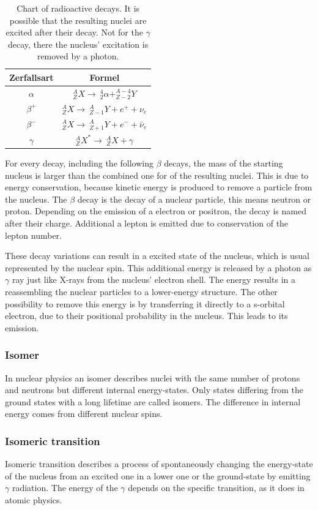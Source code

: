 \documentclass[]{article}
\begin{document}
\renewcommand{\arraystretch}{1.5}
\begin{table}[H]
\centering
\begin{tabular}{c||c}
Zerfallsart & Formel   \\ \hline
$\alpha$ & $_Z^A X \rightarrow\ _2^4\alpha + _{Z-2}^{A-4} Y$ \\ \hline
$\beta^+$ &   $_Z^A X \rightarrow\  _{Z-1}^{A}Y + e^+ + \nu_e$ \\ \hline
$\beta^-$ &   $_Z^A X \rightarrow\  _{Z+1}^{A}Y + e^- +  \bar{\nu}_e$ \\ \hline
$\gamma$ &  $_Z^A X^* \rightarrow\ _Z^A X + \gamma$  \end{tabular}
\caption{Chart of radioactive decays. It is possible that the resulting nuclei are excited after their decay. Not for the $\gamma$ decay, there the nucleus' excitation is removed by a photon. }
\label{tab:zerfall}
\end{table}
\renewcommand{\arraystretch}{1}

For every decay, including the following $\beta$ decays, the mass of the starting nucleus is larger than the combined one for of the resulting nuclei. This is due to energy conservation, because kinetic energy is produced to remove a particle from the nucleus.
The $\beta$ decay is the decay of a nuclear particle, this means neutron or proton. Depending on the emission of a electron or positron, the decay is named after their charge. Additional a lepton is emitted due to conservation of the lepton number. 

These decay variations can result in a excited state of the nucleus, which is usual represented by the nuclear spin. This additional energy is released by a photon as $\gamma$ ray just like X-rays from the nucleus' electron shell. The energy results in a reassembling the nuclear particles to a lower-energy structure. The other possibility to remove this energy is by transferring it directly to a s-orbital electron, due to their positional probability in the nucleus. This leads to its emission. 

\subsubsection{Isomer}
In nuclear physics an isomer describes nuclei with the same number of protons and neutrons but different internal energy-states. Only states differing from the ground states with a long lifetime are called isomers. The difference in internal energy comes from different nuclear spins.
\subsubsection{Isomeric transition}
Isomeric transition describes a process of spontaneously changing the energy-state of the nucleus from an excited one in a lower one or the ground-state by emitting $\gamma$ radiation. The energy of the $\gamma$ depends on the specific transition, as it does in atomic physics.
\end{document}
